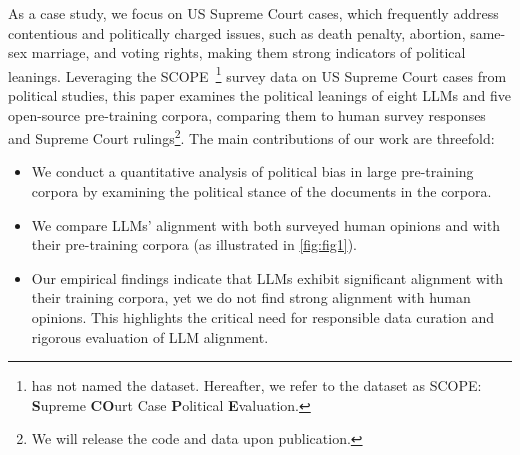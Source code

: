 As a case study, we focus on US Supreme Court cases, which frequently address contentious and politically charged issues, such as death penalty, abortion, same-sex marriage, and voting rights, making them strong indicators of political leanings. 
Leveraging the \textsc{SCOPE}~\cite{doi:10.1073/pnas.2120284119}\footnote{\citealt{doi:10.1073/pnas.2120284119} has not named the dataset. Hereafter, we refer to the dataset as \textsc{SCOPE}: \textbf{S}upreme \textbf{CO}urt Case \textbf{P}olitical \textbf{E}valuation.} survey data on US Supreme Court cases from political studies, 
this paper examines the political leanings of eight LLMs and five open-source pre-training corpora, comparing them to human survey responses and Supreme Court rulings\footnote{We will release the code and data upon publication.}. The main contributions of our work are threefold:
\begin{itemize}
    \item We conduct a quantitative analysis of political bias in large pre-training corpora by examining the political stance of the documents in the corpora.
    \item We compare LLMs' alignment with both surveyed human opinions and with their pre-training corpora (as illustrated in \autoref{fig:fig1}).
    \item Our empirical findings indicate that LLMs exhibit significant alignment with their training corpora, yet we do not find strong alignment with human opinions. This highlights the critical need for responsible data curation and rigorous evaluation of LLM alignment.
\end{itemize}
